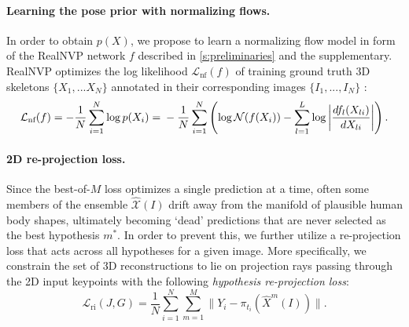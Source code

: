 
\paragraph{Learning the pose prior with normalizing flows.}
In order to obtain $p(X)$, we propose to learn a normalizing flow model in form of
the RealNVP network $f$ described in \cref{s:preliminaries} and the supplementary. RealNVP optimizes the log likelihood $\mathcal{L}_\text{nf}(f)$ of training ground truth 3D skeletons $\{X_1, ... X_N\}$ annotated in their corresponding images $\{I_1, ..., I_N\}$ :
\begin{equation}\label{e:loglik}
\mathcal{L}_\text{nf}(f)
=
-
\frac{1}{N}
\sum_{i=1}^N
\log p(X_i)
=\\
-
\frac{1}{N}
\sum_{i=1}^N
\left(
\log \mathcal{N}(f(X_i))
-
\sum_{l=1}^L
\log
\left|
\frac{d f_l(X_{li})}{d X_{li}}
\right|
\right).
\end{equation}

\paragraph{2D re-projection loss.}

Since the best-of-$M$ loss optimizes a single prediction at a time, often some members of the ensemble $\mathcal{\hat X}(I)$ drift away from the manifold of plausible human body shapes, ultimately becoming `dead' predictions that are never selected as the best hypothesis $m^*$.
In order to prevent this, we further utilize a re-projection loss that acts across all hypotheses for a given image.
More specifically, we constrain the set of 3D reconstructions to lie on projection rays passing through the 2D input keypoints with the following \emph{hypothesis re-projection loss}:
\begin{equation}\label{e:loss-ri}
  \mathcal{L}_\text{ri}(J,G)
  =
  \frac{1}{N}
  \sum_{i=1}^N
  \sum_{m=1}^M
  \big \| Y_i - \pi_{t_{i}}(\hat X^m(I)) \big \|.
\end{equation}

